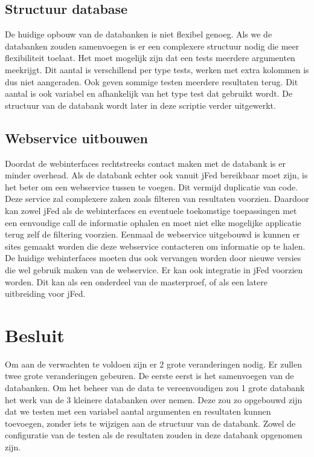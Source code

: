 \subsection{Structuur database}
\npar
De huidige opbouw van de databanken is niet flexibel genoeg. Als we de databanken zouden samenvoegen is er een complexere structuur nodig die meer flexibiliteit toelaat.
Het moet mogelijk zijn dat een tests meerdere argumenten meekrijgt. Dit aantal is verschillend per type tests, werken met extra kolommen is dus niet aangeraden.
Ook geven sommige testen meerdere resultaten terug. Dit aantal is ook variabel en afhankelijk van het type test dat gebruikt wordt.
De structuur van de databank wordt later in deze scriptie verder uitgewerkt.

\subsection{Webservice uitbouwen}
\npar
Doordat de webinterfaces rechtstreeks contact maken met de databank is er minder overhead. Als de databank echter ook vanuit jFed bereikbaar moet zijn, is het beter om een webservice tussen te voegen. Dit vermijd duplicatie van code. Deze service zal complexere zaken zoals filteren van resultaten voorzien. Daardoor kan zowel jFed als de webinterfaces en eventuele toekomstige toepassingen met een eenvoudige call de informatie ophalen en moet niet elke mogelijke applicatie terug zelf de filtering voorzien.
\npar
Eenmaal de webservice uitgebouwd is kunnen er sites gemaakt worden die deze webservice contacteren om informatie op te halen. De huidige webinterfaces moeten dus ook vervangen worden door nieuwe versies die wel gebruik maken van de webservice. Er kan ook integratie in jFed voorzien worden. Dit kan als een onderdeel van de masterproef, of als een latere uitbreiding voor jFed.

\section{Besluit}
\npar
Om aan de verwachten te voldoen zijn er 2 grote veranderingen nodig. 
Er zullen twee grote veranderingen gebeuren. De eerste eerst is het samenvoegen van de databanken. Om het beheer van de data te vereenvoudigen zou 1 grote databank het werk van de 3 kleinere databanken over nemen. Deze zou zo opgebouwd zijn dat we testen met een variabel aantal argumenten en resultaten kunnen toevoegen, zonder iets te wijzigen aan de structuur van de databank. Zowel de configuratie van de testen als de resultaten zouden in deze databank opgenomen zijn.